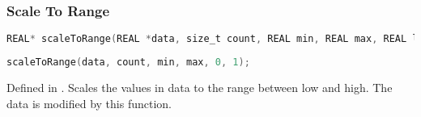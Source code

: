 \subsubsection{Scale To Range}

\begin{lstlisting}[caption={Definition of scaleToRange function},label={lst:scale_to_range_definition},language=OpenCL]
REAL* scaleToRange(REAL *data, size_t count, REAL min, REAL max, REAL low, REAL high);
\end{lstlisting}

\begin{lstlisting}[caption={Example for scaleToRange function. The data will be scaled to fit between 0 and 1.},label={lst:scale_to_range_example},language=OpenCL]
scaleToRange(data, count, min, max, 0, 1);
\end{lstlisting}

Defined in .
Scales the values in data to the range between low and high.
The data is modified by this function.
 
